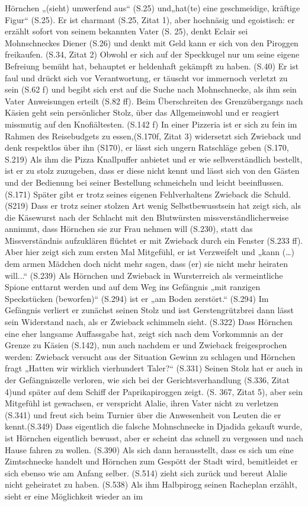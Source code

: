 Hörnchen „(sieht) umwerfend aus“ (S.25) und„hat(te) eine geschmeidige, kräftige Figur“ (S.25). Er ist charmant (S.25, Zitat 1), aber hochnäsig und egoistisch: er erzählt sofort von seinem bekannten Vater (S. 25), denkt Eclair sei Mohnschneckes Diener (S.26) und denkt mit Geld kann er sich von den Piroggen freikaufen. (S.34, Zitat 2) Obwohl er sich auf der Speckkugel nur um seine eigene Befreiung bemüht hat, behauptet er heldenhaft gekämpft zu haben. (S.40)  Er ist faul und drückt sich vor Verantwortung, er täuscht vor immernoch verletzt zu sein (S.62 f) und begibt sich erst auf die Suche nach Mohnschnecke, als ihm sein Vater Anweisungen erteilt (S.82 ff). Beim Überschreiten des Grenzübergangs nach Käsien geht sein persönlicher Stolz, über das Allgemeinwohl und er reagiert missmutig auf den Knofiältesten. (S.142 f)
In einer Pizzeria ist er sich zu fein im Rahmen des Reisebudgets zu essen,(S.170f, Zitat 3) widersetzt sich Zwieback und denk respektlos über ihn (S170), er lässt sich ungern Ratschläge geben (S.170, S.219) Als ihm die Pizza Knallpuffer anbietet und er wie selbverständlich bestellt, ist er zu stolz zuzugeben, dass er diese nicht kennt und lässt sich von den Gästen und der Bedienung bei seiner Bestellung schmeicheln und leicht beeinflussen. (S.171) Später gibt er trotz seines eigenen Fehlverhaltens Zwieback die Schuld. (S219) Dass er trotz seiner stolzen Art wenig Selbstbewusstsein hat zeigt sich, als die Käsewurst nach der Schlacht mit den Blutwürsten missverständlicherweise annimmt, dass Hörnchen sie zur Frau nehmen will (S.230), statt das Missverständnis aufzuklären flüchtet er mit Zwieback durch ein Fenster (S.233 ff). Aber hier zeigt sich zum ersten Mal Mitgefühl, er ist Verzweifelt und „kann (…) dem armen Mädchen doch nicht mehr sagen, dass (er) sie nicht mehr heiraten will...“ (S.239) Als Hörnchen und Zwieback in Wursterreich als vermeintliche Spione enttarnt werden und auf dem Weg ins Gefängnis „mit ranzigen Speckstücken (beworfen)“ (S.294) ist er „am Boden zerstört.“ (S.294) Im Gefängnis verliert er zunächst seinen Stolz und isst Gerstengrützbrei  dann lässt sein Widerstand nach, als er Zwieback schimmeln sieht. (S.322) Dass Hörnchen eine eher langsame Auffassgabe hat, zeigt sich nach dem Vorkommnis an der Grenze zu Käsien (S.142), nun auch nachdem er und Zwieback freigesprochen werden: Zwieback versucht aus der Situation Gewinn zu schlagen und Hörnchen fragt „Hatten wir wirklich vierhundert Taler?“ (S.331) Seinen Stolz hat er auch in der Gefängniszelle verloren, wie sich bei der Gerichtsverhandlung (S.336, Zitat 4)und später auf dem Schiff der Paprikapiroggen zeigt. (S. 367, Zitat 5), aber sein Mitgefühl ist gewachsen, er verspricht Alalie, ihren Vater nicht zu verletzen (S.341) und freut sich beim Turnier über die Anwesenheit von Leuten die er kennt.(S.349) Dass eigentlich die falsche Mohnschnecke in Djadida gekauft wurde, ist Hörnchen eigentlich bewusst, aber er scheint das schnell zu vergessen und nach Hause fahren zu wollen. (S.390) Als sich dann herausstellt, dass es sich um eine Zimtschnecke handelt und Hörnchen zum Gespött der Stadt wird, bemitleidet er sich ebenso wie am Anfang selber. (S.514) zieht sich zurück und bereut Alalie nicht geheiratet zu haben. (S.538) Als ihm Halbpirogg seinen Racheplan erzählt, sieht er eine Möglichkeit wieder an im 